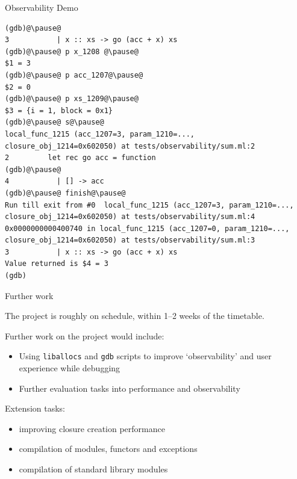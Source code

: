 \documentclass[pdf]{beamer}
\begin{document}
\begin{frame}[fragile]{Observability Demo}
\begin{lstlisting}[basicstyle=\ttfamily\footnotesize]
(gdb)@\pause@
3           | x :: xs -> go (acc + x) xs
(gdb)@\pause@ p x_1208 @\pause@
$1 = 3
(gdb)@\pause@ p acc_1207@\pause@
$2 = 0
(gdb)@\pause@ p xs_1209@\pause@
$3 = {i = 1, block = 0x1}
(gdb)@\pause@ s@\pause@
local_func_1215 (acc_1207=3, param_1210=..., closure_obj_1214=0x602050) at tests/observability/sum.ml:2
2         let rec go acc = function
(gdb)@\pause@
4           | [] -> acc
(gdb)@\pause@ finish@\pause@
Run till exit from #0  local_func_1215 (acc_1207=3, param_1210=..., closure_obj_1214=0x602050) at tests/observability/sum.ml:4
0x0000000000400740 in local_func_1215 (acc_1207=0, param_1210=..., closure_obj_1214=0x602050) at tests/observability/sum.ml:3
3           | x :: xs -> go (acc + x) xs
Value returned is $4 = 3
(gdb)
\end{lstlisting}
\end{frame}

\begin{frame}{Further work}

The project is roughly on schedule, within 1--2 weeks of the timetable.
\vspace{1em}

Further work on the project would include:
\begin{itemize}
    \pause
    \item Using \texttt{liballocs} and \texttt{gdb} scripts to improve
    `observability' and user experience while debugging
    \pause
    \item Further evaluation tasks into performance and observability
\end{itemize}

\pause
Extension tasks:
\begin{itemize}
    \pause
    \item improving closure creation performance
    \pause
    \item compilation of modules, functors and exceptions
    \pause
    \item compilation of standard library modules
\end{itemize}

\end{frame}
\end{document}
